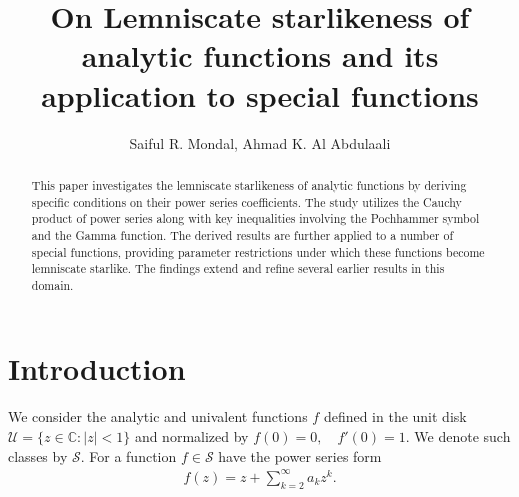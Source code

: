 \documentclass[a4paper,11pt,reqno]{amsart}
\begin{document}
\title{On Lemniscate starlikeness of analytic functions and its application to special functions}

\author{Saiful R. Mondal, Ahmad K. Al Abdulaali}
\address{Department of Mathematics and Statistics, Collage of Science, King Faisal University, Al-Hasa 31982, Hofuf, Saudi Arabia}





\begin{abstract}
This paper investigates the lemniscate starlikeness of analytic functions by deriving specific conditions on their power series coefficients. The study utilizes the Cauchy product of power series along with key inequalities involving the Pochhammer symbol and the Gamma function. The derived results are further applied to a number of special functions, providing parameter restrictions under which these functions become lemniscate starlike. The findings extend and refine several earlier results in this domain.  
\end{abstract}



\maketitle


\section{Introduction}\label{intro}
We consider the analytic and univalent functions $f$ defined in the unit disk $\mathcal{U} = \{ z \in \mathbb{C} : |z| < 1 \}$ 
and normalized by $f(0) = 0, \quad f'(0) = 1$. We denote such classes by $\mathcal{S}$. For a function $f \in \mathcal{S}$ have the power series form 
\begin{align}\label{eqn:power-series}
    f(z)= z + \sum_{k=2}^{\infty} a_k z^k.
\end{align}
\end{document}

